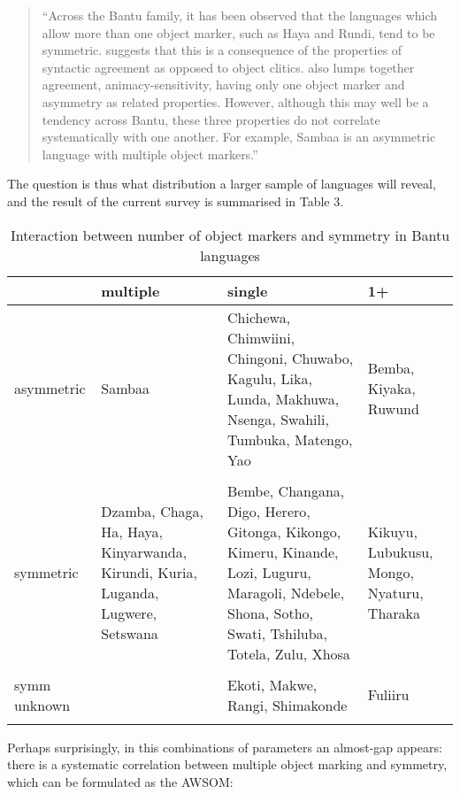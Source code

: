\documentclass[output=paper
,modfonts
,nonflat]{langsci/langscibook}
\begin{document}
\begin{quote}
	“Across the Bantu family, it has been observed that the languages which allow more than one object marker, such as Haya and Rundi, tend to be symmetric. \citet{Baker2008} suggests that this is a consequence of the properties of syntactic agreement as opposed to object clitics. \citet{Bentley1994} also lumps together agreement, animacy-sensitivity, having only one object marker and asymmetry as related properties. However, although this may well be a tendency across Bantu, these three properties do not correlate systematically with one another. For example, Sambaa is an asymmetric language with multiple object markers.” \citep[78]{Riedel2009}
\end{quote}
The question is thus what distribution a larger sample of languages will reveal, and the result of the current survey is summarised in Table 3.
\begin{table}
\caption{Interaction between number of object markers and symmetry in Bantu languages} 
\label{Table 3}
\begin{tabularx}{\textwidth}{XXXX}
	\lsptoprule
	& multiple & single & 1+\\
	\midrule
	asymmetric & Sambaa & Chichewa, Chimwiini, Chingoni, Chuwabo, Kagulu, Lika, Lunda, Makhuwa, Nsenga, Swahili, Tumbuka, Matengo, Yao & Bemba, Kiyaka, Ruwund\\ \\
	\midrule
	symmetric & Dzamba, Chaga, Ha, Haya, Kinyarwanda, Kirundi, Kuria, Luganda, Lugwere, Setswana & Bembe, Changana, Digo, Herero, Gitonga, Kikongo, Kimeru, Kinande, Lozi, Luguru, Maragoli, Ndebele, Shona, Sotho, Swati, Tshiluba, Totela, Zulu, Xhosa & Kikuyu, Lubukusu, Mongo, Nyaturu, Tharaka\\ \\
	\midrule
	symm unknown &  & Ekoti, Makwe, Rangi, Shimakonde & Fuliiru\\
	\lspbottomrule
\end{tabularx}
\end{table}
Perhaps surprisingly, in this combinations of parameters an almost-gap appears: there is a systematic correlation between multiple object marking and symmetry, which can be formulated as the AWSOM:
\end{document}
